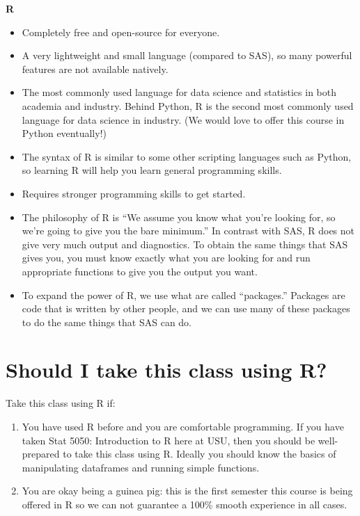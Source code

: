\documentclass{article}\usepackage[]{graphicx}\usepackage[]{color}
\begin{document}
\textbf{R}
\begin{itemize}
  \item Completely free and open-source for everyone.
  \item A very lightweight and small language (compared to SAS), so many powerful features are not available natively.
  \item The most commonly used language for data science and statistics in both academia and industry. Behind Python, R is the second most commonly used language for data science in industry. (We would love to offer this course in Python eventually!)
  \item The syntax of R is similar to some other scripting languages such as Python, so learning R will help you learn general programming skills.
  \item Requires stronger programming skills to get started.
  \item The philosophy of R is ``We assume you know what you're looking for, so we're going to give you the bare minimum.'' In contrast with SAS, R does not give very much output and diagnostics. To obtain the same things that SAS gives you, you must know exactly what you are looking for and run appropriate functions to give you the output you want.
  \item To expand the power of R, we use what are called ``packages.'' Packages are code that is written by other people, and we can use many of these packages to do the same things that SAS can do.
\end{itemize}

\section{Should I take this class using R?}

Take this class using R if:

\begin{enumerate}
  \item You have used R before and you are comfortable programming. If you have taken Stat 5050: Introduction to R here at USU, then you should be well-prepared to take this class using R. Ideally you should know the basics of manipulating dataframes and running simple functions.
  \item You are okay being a guinea pig: this is the first semester this course is being offered in R so we can not guarantee a 100\% smooth experience in all cases.
\end{enumerate}
\end{document}
